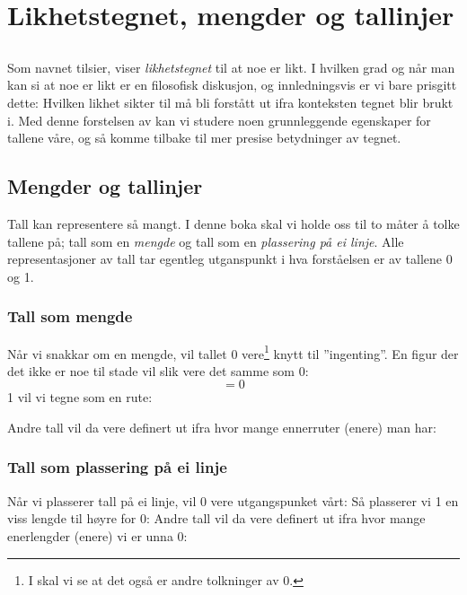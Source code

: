 



\newpage
\section{Likhetstegnet, mengder og tallinjer}
\subsection*{\likteikn}
Som navnet tilsier, viser \textit{likhetstegnet}  \sym{$ = $} til at noe er likt. I hvilken grad og når man kan si at noe er likt er en filosofisk diskusjon, og innledningsvis er vi bare prisgitt dette: Hvilken likhet \sym{$=$} sikter til må bli forstått ut ifra konteksten tegnet blir brukt i. Med denne forstelsen av \sym{$ = $} kan vi studere noen grunnleggende egenskaper for tallene våre, og så komme tilbake til mer presise betydninger av tegnet. \regv
{}
\subsection*{Mengder og tallinjer}
Tall kan representere så mangt. I denne boka skal vi holde oss til to måter å tolke tallene på; tall som en \textsl{mengde} og tall som en \textsl{plassering på ei linje}. Alle representasjoner av tall tar egentleg utganspunkt i hva forståelsen er av tallene 0 og 1.

\subsubsection*{Tall som mengde}
	Når vi snakkar om en mengde, vil tallet 0 vere\footnote{I  skal vi se at det også er andre tolkninger av 0.} knytt til ''ingenting''. En figur der det ikke er noe til stade vil slik vere det samme som 0:
	\[ =0 \]
	1 vil vi tegne som en rute:

Andre tall vil da vere definert ut ifra hvor mange ennerruter (enere) man har:
\newpage	
\subsubsection*{Tall som plassering på ei linje}
	Når vi plasserer tall på ei linje, vil 0 vere utgangspunket vårt:
	Så plasserer vi 1 en viss lengde til høyre for 0:
	Andre tall vil da vere definert ut ifra hvor mange enerlengder (enere) vi er unna 0:
